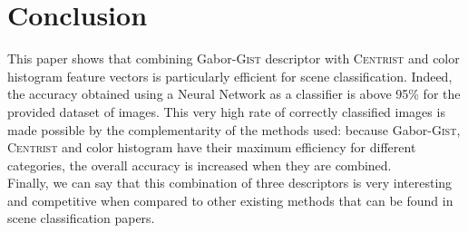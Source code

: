 \documentclass[%
	final,
	narroweqnarray,
	notitlepage,
	inline,
	twoside,
	]{ieee}
\begin{document}
\section{Conclusion}
\label{sec:Conclusion}
This paper shows that combining Gabor-\textsc{Gist} descriptor with \textsc{Centrist} and color histogram feature vectors is particularly efficient for scene classification. Indeed, the accuracy obtained using a Neural Network as a classifier is above 95\% for the provided dataset of images. This very high rate of correctly classified images is made possible by the complementarity of the methods used: because Gabor-\textsc{Gist}, \textsc{Centrist} and color histogram have their maximum efficiency for different categories, the overall accuracy is increased when they are combined. \\
Finally, we can say that this combination of three descriptors is very interesting and competitive when compared to other existing methods that can be found in scene classification papers. 

 
 
\end{document}
